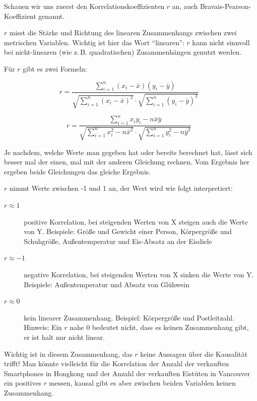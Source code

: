 \documentclass[ngerman, 12pt,parskip=half]{scrartcl}
\begin{document}
Schauen wir uns zuerst den Korrelationskoeffizienten \(r\) an, auch Bravais-Pearson-Koeffizient  genannt. 

\(r\) misst die Stärke und Richtung des linearen Zusammenhangs zwischen zwei metrischen Variablen. Wichtig ist hier das Wort \enquote{linearen}: \(r\) kann nicht sinnvoll bei nicht-linearen (wie z.\,B. quadratischen) Zusammenhängen genutzt werden.

Für \(r\) gibt es zwei Formeln:

\begin{equation}
r = \frac{\sum_{i=1}^n (x_i - \bar{x})(y_i - \bar{y})}%
{ \sqrt{\sum_{i=1}^n (x_i - \bar{x})^2}  \cdot \sqrt{\sum_{i=1}^n (y_i - \bar{y})^2}}
\end{equation}

\begin{equation}
r = \frac{\sum_{i=1}^n x_iy_i - n\bar{x}\bar{y}}%
{\sqrt{\sum_{i=1}^n x_i^2 - n\bar{x}^2}\cdot \sqrt{\sum_{i=1}^n y_i^2 - n\bar{y}^2}}
\end{equation}

Je nachdem, welche Werte man gegeben hat oder bereits berechnet hat, lässt sich besser mal der einen, mal mit der anderen Gleichung rechnen. Vom Ergebnis her ergeben beide Gleichungen das gleiche Ergebnis.

\(r\) nimmt Werte zwischen -1 und 1 an, der Wert wird wie folgt interpretiert:

\begin{description}
\item [\(r \approx 1\)] positive Korrelation, bei steigenden Werten von X steigen auch die Werte von Y. Beispiele: Größe und Gewicht einer Person, Körpergröße und Schuhgröße, Außentemperatur und Eis-Absatz an der Eisdiele
\item [\(r \approx -1\)] negative Korrelation, bei steigenden Werten von X sinken die Werte von Y. Beispiele: Außentemperatur und Absatz von Glühwein
\item [\(r \approx 0\)] kein linearer Zusammenhang. Beispiel: Körpergröße und Postleitzahl. Hinweis: Ein \(r\) nahe 0 bedeutet nicht, dass es keinen Zusammenhang gibt, er ist halt nur nicht linear. 
\end{description}

Wichtig ist in diesem Zusammenhang, das \(r\) keine Aussagen über die Kausalität trifft! Man könnte vielleicht für die Korrelation der Anzahl der verkauften Smartphones in Hongkong und der Anzahl der verkauften Eistüten in Vancouver ein positives \(r\) messen, kausal gibt es aber zwischen beiden Variablen keinen Zusammenhang.
\end{document}
